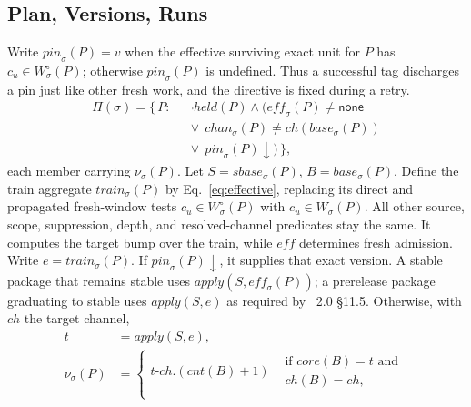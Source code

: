 \subsection{Plan, Versions, Runs}

\begin{definition}
\label{def:plan}
Write $\mathit{pin}_\sigma(P)=v$ when the effective surviving exact
 unit for $P$ has $c_u\in W^\circ_\sigma(P)$; otherwise
$\mathit{pin}_\sigma(P)$ is undefined. Thus a successful tag discharges a
pin just like other fresh work, and the directive is fixed during a retry.
\begin{equation}
\begin{aligned}
  \Pi(\sigma) = \{\, P :\;
    &\lnot\mathit{held}(P) \wedge (\mathit{eff}_\sigma(P) \neq
     \mathsf{none} \\
    &\ \lor\ \mathit{chan}_\sigma(P) \neq
     \mathit{ch}(\mathit{base}_\sigma(P))
     \\
    &\ \lor\ \mathit{pin}_\sigma(P)\downarrow) \,\},
\end{aligned}
\end{equation}
each member carrying $\nu_\sigma(P)$. Let $S=\mathit{sbase}_\sigma(P)$,
$B=\mathit{base}_\sigma(P)$. Define the train aggregate
$\mathit{train}_\sigma(P)$ by Eq.~\ref{eq:effective}, replacing its direct
and propagated fresh-window tests $c_u\in W^\circ_\sigma(P)$ with
$c_u\in W_\sigma(P)$. All other source, scope, suppression, depth, and
resolved-channel predicates stay the same. It computes the target bump over
the train, while $\mathit{eff}$ determines fresh admission. Write
$e=\mathit{train}_\sigma(P)$.
If $\mathit{pin}_\sigma(P)\downarrow$, it supplies that exact version. A stable package that
remains stable uses $\mathit{apply}(S,\mathit{eff}_\sigma(P))$; a prerelease
package graduating to stable uses $\mathit{apply}(S,e)$ as required by
\lang{}~2.0 \S11.5. Otherwise, with $\mathit{ch}$ the target channel,
\begin{equation}
\label{eq:train}
\begin{aligned}
  t &= \mathit{apply}(S, e), \\
  \nu_\sigma(P) &=
  \begin{cases}
    t\text{-}\mathit{ch}.(\mathit{cnt}(B){+}1)
      & \begin{array}{l}\text{if } \mathit{core}(B) = t\text{ and}\\
        \mathit{ch}(B) = \mathit{ch},\end{array}\\

\end{cases}
\end{aligned}
\end{equation}
\end{definition}
